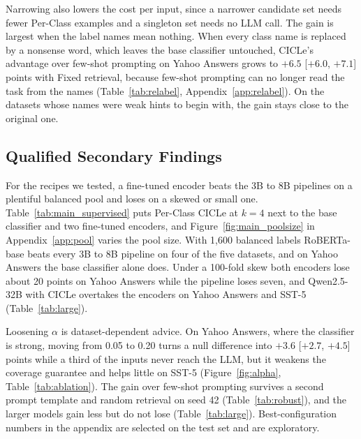Narrowing also lowers the cost per input, since a narrower candidate set needs fewer Per-Class examples and a singleton set needs no LLM call. %
The gain is largest when the label names mean nothing.
When every class name is replaced by a nonsense word, which leaves the base classifier untouched, CICLe's advantage over few-shot prompting on Yahoo Answers grows to $+6.5$ [$+6.0$, $+7.1$] points with Fixed retrieval, because few-shot prompting can no longer read the task from the names (Table~\ref{tab:relabel}, Appendix~\ref{app:relabel}). %
On the datasets whose names were weak hints to begin with, the gain stays close to the original one.

\subsection{Qualified Secondary Findings}
\label{sec:res-secondary}
\label{sec:res-baselines}
\label{sec:res-alpha}

For the recipes we tested, a fine-tuned encoder beats the 3B to 8B pipelines on a plentiful balanced pool and loses on a skewed or small one.
Table~\ref{tab:main_supervised} puts Per-Class CICLe at $k = 4$ next to the base classifier and two fine-tuned encoders, and Figure~\ref{fig:main_poolsize} in Appendix~\ref{app:pool} varies the pool size.
With 1,600 balanced labels RoBERTa-base beats every 3B to 8B pipeline on four of the five datasets, and on Yahoo Answers the base classifier alone does. %
Under a 100-fold skew both encoders lose about 20 points on Yahoo Answers while the pipeline loses seven, and Qwen2.5-32B with CICLe overtakes the encoders on Yahoo Answers and SST-5 (Table~\ref{tab:large}). %


Loosening $\alpha$ is dataset-dependent advice.
On Yahoo Answers, where the classifier is strong, moving from 0.05 to 0.20 turns a null difference into $+3.6$ [$+2.7$, $+4.5$] points while a third of the inputs never reach the LLM, but it weakens the coverage guarantee and helps little on SST-5 (Figure~\ref{fig:alpha}, Table~\ref{tab:ablation}).
The gain over few-shot prompting survives a second prompt template and random retrieval on seed 42 (Table~\ref{tab:robust}), and the larger models gain less but do not lose (Table~\ref{tab:large}). %
Best-configuration numbers in the appendix are selected on the test set and are exploratory.
